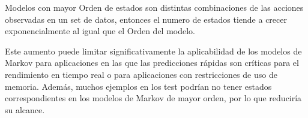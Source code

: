 Modelos con mayor Orden de estados son distintas combinaciones de las acciones observadas en un set de datos, entonces el numero de estados tiende a crecer exponencialmente al igual que el Orden del modelo.

Este aumento puede limitar significativamente la aplicabilidad de los modelos de Markov para aplicaciones en las que las predicciones rápidas son críticas para el rendimiento en tiempo real o para aplicaciones con restricciones de uso de memoria. Además, muchos ejemplos en los test podrían no tener estados correspondientes en los modelos de Markov de mayor orden, por lo que reduciría su alcance.
 
 

\nocite{*}

